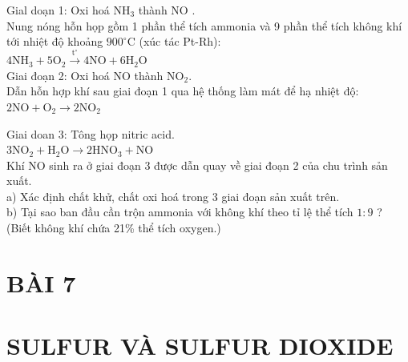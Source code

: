 \documentclass[10pt]{article}
\begin{document}
Gial doạn 1: Oxi hoá $\mathrm{NH}_{3}$ thành NO .\\
Nung nóng hỗn họp gồm 1 phần thể tích ammonia và 9 phần thể tích không khí tới nhiệt độ khoảng $900^{\circ} \mathrm{C}$ (xúc tác Pt-Rh):\\
$4 \mathrm{NH}_{3}+5 \mathrm{O}_{2} \xrightarrow{\mathrm{t}^{\circ}} 4 \mathrm{NO}+6 \mathrm{H}_{2} \mathrm{O}$\\
Giai đoạn 2: Oxi hoá NO thành $\mathrm{NO}_{2}$.\\
Dẫn hỗn hợp khí sau giai đoạn 1 qua hệ thống làm mát để hạ nhiệt độ:\\
$2 \mathrm{NO}+\mathrm{O}_{2} \longrightarrow 2 \mathrm{NO}_{2}$

Giai doan 3: Tông họp nitric acid.\\
$3 \mathrm{NO}_{2}+\mathrm{H}_{2} \mathrm{O} \longrightarrow 2 \mathrm{HNO}_{3}+\mathrm{NO}$\\
Khí NO sinh ra ở giai đoạn 3 được dẫn quay về giai đoạn 2 của chu trình sản xuất.\\
a) Xác định chất khử, chất oxi hoá trong 3 giai đoạn sản xuất trên.\\
b) Tại sao ban đầu cần trộn ammonia với không khí theo tỉ lệ thể tích $1: 9$ ? (Biết không khí chứa 21\% thể tích oxygen.)

\section*{BÀI 7}
\section*{SULFUR VÀ SULFUR DIOXIDE}
\end{document}
